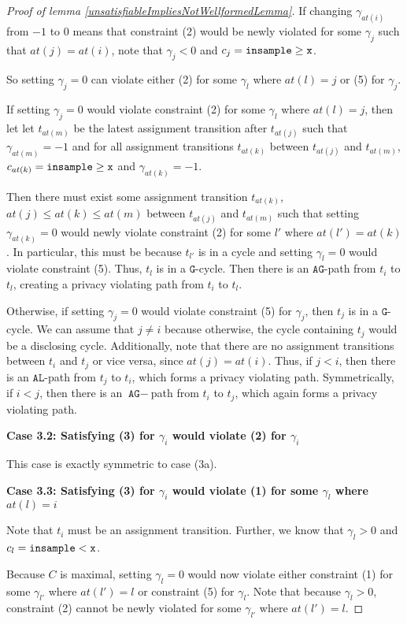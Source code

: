 \begin{proof}[Proof of lemma \ref{unsatisfiableImpliesNotWellformedLemma}]
    If changing $\gamma_{at(i)}$ from $-1$ to $0$ means that constraint (2) would be newly violated for some $\gamma_j$ such that $at(j) = at(i)$, note that $\gamma_j < 0$ and $c_j = \gguard[\texttt{x}]$. 
    
    So setting $\gamma_j = 0$ can violate either (2) for some $\gamma_l$ where $at(l) = j$ or (5) for $\gamma_j$. 

    If setting $\gamma_j = 0$ would violate constraint (2) for some $\gamma_l$ where $at(l) = j$, then let let $t_{at(m)}$ be the latest assignment transition after $t_{at(j)}$ such that $\gamma_{at(m)} = -1$ and for all assignment transitions $t_{at(k)}$ between $t_{at(j)}$ and $t_{at(m)}$, $c_{at(k)} = \gguard[\texttt{x}]$ and $\gamma_{at(k)} = -1$. 
    
    Then there must exist some assignment transition $t_{at(k)}$, $at(j)\leq at(k)\leq at(m)$ between $t_{at(j)}$ and $t_{at(m)}$ such that setting $\gamma_{at(k)} = 0$ would newly violate constraint (2) for some $l'$ where $at(l') = at(k)$. 
    In particular, this must be because $t_{l'}$ is in a cycle and setting $\gamma_l = 0$ would violate constraint (5). Thus, $t_l$ is in a $\texttt{G}$-cycle. Then there is an $\texttt{AG}$-path from $t_i$ to $t_l$, creating a privacy violating path from $t_i$ to $t_l$. 

    Otherwise, if setting $\gamma_j = 0$ would violate constraint (5) for $\gamma_j$, then $t_j$ is in a $\texttt{G}$-cycle. We can assume that $j\neq i$ because otherwise, the cycle containing $t_j$ would be a disclosing cycle. Additionally, note that there are no assignment transitions between $t_i$ and $t_j$ or vice versa, since $at(j) = at(i)$.
    Thus, if $j<i$, then there is an $\texttt{AL}$-path from $t_j$ to $t_i$, which forms a privacy violating path. Symmetrically, if $i<j$, then there is an $\texttt{AG}-$path from $t_i$ to $t_j$, which again forms a privacy violating path. 

    \textbf{Case 3.2: Satisfying (3) for $\gamma_i$ would violate (2) for $\gamma_i$}

    This case is exactly symmetric to case (3a).

    \textbf{Case 3.3: Satisfying (3) for $\gamma_i$ would violate (1) for some $\gamma_l$ where $at(l) = i$}

    Note that $t_i$ must be an assignment transition. Further, we know that $\gamma_l>0$ and $c_l = \lguard[\texttt{x}]$. 
    
    Because $C$ is maximal, setting $\gamma_l=0$ would now violate either constraint (1) for some $\gamma_{l'}$ where $at(l') = l$ or constraint (5) for $\gamma_l$. Note that because $\gamma_l>0$, constraint (2) cannot be newly violated for some $\gamma_{l'}$ where $at(l') = l$.


\end{proof}
